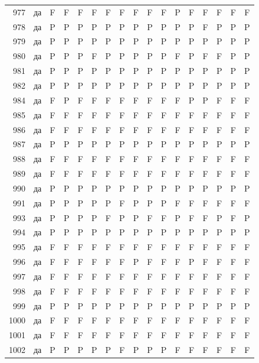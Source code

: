 \begin{table}[p]
\begin{tabular*}{\textwidth}{@{\extracolsep{\fill}}rcccccccccccccccc}
977 & да & F & F & F & F & F & F & F & F & F & P & F & F & F & F & F\\
978 & да & P & P & P & P & P & P & P & P & P & P & P & F & P & P & P\\
979 & да & P & P & P & P & P & P & P & P & P & P & P & P & P & P & P\\
980 & да & P & P & P & F & P & P & P & P & P & F & P & F & F & P & P\\
981 & да & P & P & P & P & P & P & P & P & P & P & P & P & P & P & P\\
982 & да & P & P & P & P & P & P & P & P & P & P & P & P & P & P & P\\
984 & да & F & P & F & F & F & F & F & F & F & F & P & P & F & F & F\\
985 & да & F & F & F & F & F & F & F & F & F & F & F & F & F & F & F\\
986 & да & F & F & F & F & F & F & F & F & F & F & F & F & F & F & F\\
987 & да & P & P & P & P & P & P & P & P & P & P & P & P & P & P & P\\
988 & да & F & F & F & F & F & F & F & F & F & F & F & F & F & F & F\\
989 & да & F & F & F & F & F & F & F & F & F & F & F & F & F & F & F\\
990 & да & P & P & P & P & P & P & P & P & P & P & P & P & P & P & P\\
991 & да & P & P & P & P & P & F & P & P & P & F & F & F & F & F & F\\
993 & да & P & P & P & P & F & P & P & F & F & P & F & F & P & F & P\\
994 & да & P & P & P & P & P & P & P & P & P & P & P & P & P & P & P\\
995 & да & F & F & F & F & F & F & F & F & F & F & F & F & F & F & F\\
996 & да & F & F & F & F & F & F & P & F & F & F & P & F & F & F & F\\
997 & да & F & F & F & F & F & F & F & F & F & F & F & F & F & F & F\\
998 & да & F & F & F & F & F & F & F & F & F & F & F & F & F & F & F\\
999 & да & P & P & P & P & P & P & P & P & P & P & P & P & P & P & P\\
1000 & да & F & F & F & F & F & F & F & F & F & F & F & F & F & F & F\\
1001 & да & F & F & F & F & F & F & F & F & F & F & F & F & F & F & F\\
1002 & да & P & P & P & P & P & F & P & P & P & F & F & F & F & F & F\\
\bottomrule\end{tabular*}\end{table}
\clearpage

